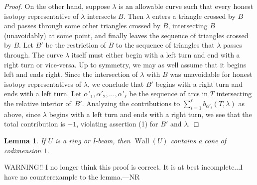 \documentclass{amsart}
\newtheorem{lemma}[proposition]{Lemma}
\theoremstyle{definition}
\theoremstyle{remark}
\numberwithin{equation}{section}
\newcommand{\margincolor}{red}
\newcommand{\marginauthorcolor}{darkgreen}
\newcounter{margincounter}
\newcommand{\marginnum}{
\ifnum\value{margincounter}<10
\textcolor{\margincolor}{\begin{picture}(0,0)\put(2.2,2.4){\circle{9}}\end{picture}\footnotesize\arabic{margincounter}}
\else\ifnum\value{margincounter}<100
\textcolor{\margincolor}{\begin{picture}(0,0)\put(4.256,2.5){\circle{11}}\end{picture}\footnotesize\arabic{margincounter}}
\else
\textcolor{\margincolor}{\begin{picture}(0,0)\put(6.8,2.5){\circle{14}}\end{picture}\footnotesize\arabic{margincounter}}
\fi\fi
}
\newcommand{\margin}[2][]
{\!\!\refstepcounter{margincounter}\marginnum\marginpar{\textcolor{\margincolor}{\arabic{margincounter}.}\,\,\tiny #2\,\,\,\textcolor{\marginauthorcolor}{\small#1}}}
\newcommand{\marginN}[1]{\margin[NR]{#1}}
\newcommand{\0}{{\mathbf{0}}}
\newcommand{\Wall}{\operatorname{Wall}}
\begin{document}
\begin{proof}
On the other hand, suppose $\lambda$ is an allowable curve such that every honest isotopy representative of $\lambda$ intersects $B$.
Then $\lambda$ enters a triangle crossed by $B$ and passes through some other triangles crossed by $B$, intersecting $B$ (unavoidably) at some point, and finally leaves the sequence of triangles crossed by $B$.
Let $B'$ be the restriction of $B$ to the sequence of triangles that $\lambda$ passes through. 
The curve $\lambda$ itself must either begin with a left turn and end with a right turn or vice-versa. 
Up to symmetry, we may as well assume that it begins left and ends right.
Since the intersection of $\lambda$ with $B$ was unavoidable for honest isotopy representatives of $\lambda$, we conclude that $B'$ begins with a right turn and ends with a left turn.
Let $\alpha'_1, \alpha'_2,\ldots,\alpha'_\ell$ be the sequence of arcs in $T$ intersecting the relative interior of~$B'$.
Analyzing the contributions to $\sum_{i=1}^\ell b_{\alpha'_i}(T,\lambda)$ as above, since $\lambda$ begins with a left turn and ends with a right turn, we see that the total contribution is $-1$, violating assertion (1) for $B'$ and $\lambda$.
\end{proof}


\begin{lemma}\label{codim lemma}
If $U$ is a ring or I-beam, then $\Wall(U)$ contains a cone of codimension $1$.
\end{lemma}

WARNING!!  I no longer think this proof is correct.
It is at best incomplete...I have no counterexample to the lemma.---NR
\end{document}
